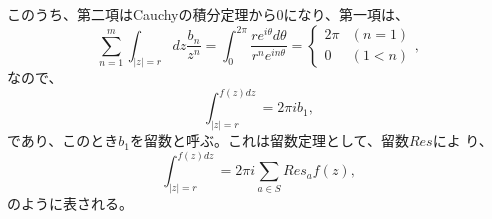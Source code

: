 このうち、第二項はCauchyの積分定理から0になり、第一項は、
\begin{equation}
 \sum_{n=1}^{m} \int_{|z|=r}dz \frac{b_n}{z^n}
  = \int_{0}^{2\pi}\frac{re^{i\theta}d\theta}{r^ne^{in\theta}}
  =
  \begin{cases}
   2\pi & (n=1) \\
   0 & (1 < n)
  \end{cases},
\end{equation}
なので、
\begin{equation}
 \int_{|z|=r}^{f(z)dz} = 2\pi i b_1,
\end{equation}
であり、このとき$b_1$を留数と呼ぶ。これは留数定理として、留数$Res$によ
り、
\begin{equation}
  \int_{|z|=r}^{f(z)dz} = 2\pi i \sum_{a\in S}Res_{a} f(z),
\end{equation}
のように表される。